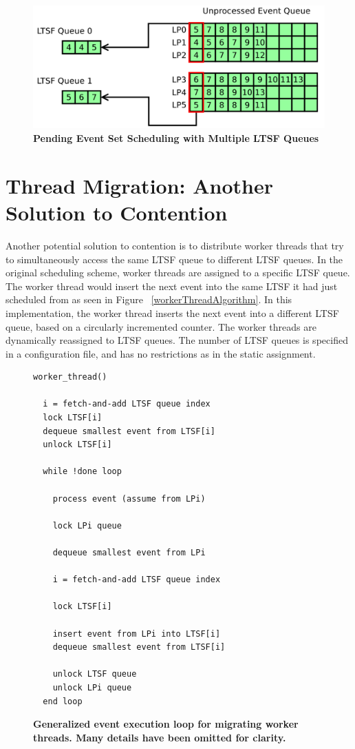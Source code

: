 \documentclass[11pt]{book}
\begin{document}
\begin{figure}[H]
    \centering
    \graphicspath{ {./figures/} }
    \includegraphics[width=\textwidth,height=\textheight,keepaspectratio]{multiple_ltsf}
    \caption{\textbf{Pending Event Set Scheduling with Multiple LTSF Queues}}
    \label{fig:multipleLTSF}
\end{figure}

\section{Thread Migration: Another Solution to Contention}

Another potential solution to contention is to distribute worker threads that try to
simultaneously access the same LTSF queue to different LTSF queues.  In the original
scheduling scheme, worker threads are assigned to a specific LTSF queue.  The worker
thread would insert the next event into the same LTSF it had just scheduled from as seen
in Figure ~\ref{workerThreadAlgorithm}.  In this implementation, the worker thread inserts
the next event into a different LTSF queue, based on a circularly incremented counter.
The worker threads are dynamically reassigned to LTSF queues. The number of LTSF queues is
specified in a configuration file, and has no restrictions as in the static assignment.

\linespread{1.0}
\begin{figure}
\begin{verbatim}
worker_thread()

  i = fetch-and-add LTSF queue index
  lock LTSF[i]
  dequeue smallest event from LTSF[i]
  unlock LTSF[i]

  while !done loop

    process event (assume from LPi)

    lock LPi queue
    
    dequeue smallest event from LPi

    i = fetch-and-add LTSF queue index

    lock LTSF[i]

    insert event from LPi into LTSF[i]
    dequeue smallest event from LTSF[i]

    unlock LTSF queue
    unlock LPi queue
  end loop
\end{verbatim}
\caption{\textbf{Generalized event execution loop for migrating worker threads.  Many
    details have been omitted for clarity.}}\label{migratinWorkerThreadAlgorithm}
\end{figure}
\end{document}
